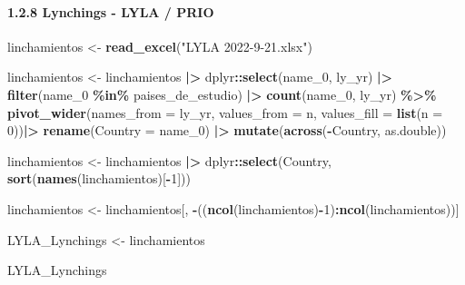 \documentclass[
  11pt,
]{article}
\newenvironment{Shaded}{\begin{snugshade}}{\end{snugshade}}
\newcommand{\AttributeTok}[1]{\textcolor[rgb]{0.13,0.29,0.53}{#1}}
\newcommand{\DecValTok}[1]{\textcolor[rgb]{0.00,0.00,0.81}{#1}}
\newcommand{\FunctionTok}[1]{\textcolor[rgb]{0.13,0.29,0.53}{\textbf{#1}}}
\newcommand{\NormalTok}[1]{#1}
\newcommand{\OtherTok}[1]{\textcolor[rgb]{0.56,0.35,0.01}{#1}}
\newcommand{\SpecialCharTok}[1]{\textcolor[rgb]{0.81,0.36,0.00}{\textbf{#1}}}
\newcommand{\StringTok}[1]{\textcolor[rgb]{0.31,0.60,0.02}{#1}}
\begin{document}
\paragraph{1.2.8 Lynchings - LYLA / PRIO}\label{lynchings---lyla-prio}

\begin{Shaded}
\begin{Highlighting}[]
\NormalTok{linchamientos }\OtherTok{\textless{}{-}} \FunctionTok{read\_excel}\NormalTok{(}\StringTok{"LYLA 2022{-}9{-}21.xlsx"}\NormalTok{)}

\NormalTok{linchamientos }\OtherTok{\textless{}{-}}\NormalTok{ linchamientos }\SpecialCharTok{|\textgreater{}}
\NormalTok{  dplyr}\SpecialCharTok{::}\FunctionTok{select}\NormalTok{(name\_0, ly\_yr) }\SpecialCharTok{|\textgreater{}}
  \FunctionTok{filter}\NormalTok{(name\_0 }\SpecialCharTok{\%in\%}\NormalTok{ paises\_de\_estudio) }\SpecialCharTok{|\textgreater{}}
  \FunctionTok{count}\NormalTok{(name\_0, ly\_yr) }\SpecialCharTok{\%\textgreater{}\%} 
  \FunctionTok{pivot\_wider}\NormalTok{(}\AttributeTok{names\_from =}\NormalTok{ ly\_yr, }\AttributeTok{values\_from =}\NormalTok{ n, }\AttributeTok{values\_fill =} \FunctionTok{list}\NormalTok{(}\AttributeTok{n =} \DecValTok{0}\NormalTok{))}\SpecialCharTok{|\textgreater{}}
  \FunctionTok{rename}\NormalTok{(}\AttributeTok{Country =}\NormalTok{ name\_0) }\SpecialCharTok{|\textgreater{}}
  \FunctionTok{mutate}\NormalTok{(}\FunctionTok{across}\NormalTok{(}\SpecialCharTok{{-}}\NormalTok{Country, as.double))}

\NormalTok{linchamientos }\OtherTok{\textless{}{-}}\NormalTok{ linchamientos }\SpecialCharTok{|\textgreater{}}\NormalTok{ dplyr}\SpecialCharTok{::}\FunctionTok{select}\NormalTok{(Country, }\FunctionTok{sort}\NormalTok{(}\FunctionTok{names}\NormalTok{(linchamientos)[}\SpecialCharTok{{-}}\DecValTok{1}\NormalTok{]))}

\NormalTok{linchamientos }\OtherTok{\textless{}{-}}\NormalTok{ linchamientos[, }\SpecialCharTok{{-}}\NormalTok{((}\FunctionTok{ncol}\NormalTok{(linchamientos)}\SpecialCharTok{{-}}\DecValTok{1}\NormalTok{)}\SpecialCharTok{:}\FunctionTok{ncol}\NormalTok{(linchamientos))]}

\NormalTok{LYLA\_Lynchings }\OtherTok{\textless{}{-}}\NormalTok{ linchamientos}

\NormalTok{LYLA\_Lynchings}
\end{Highlighting}
\end{Shaded}
\end{document}
